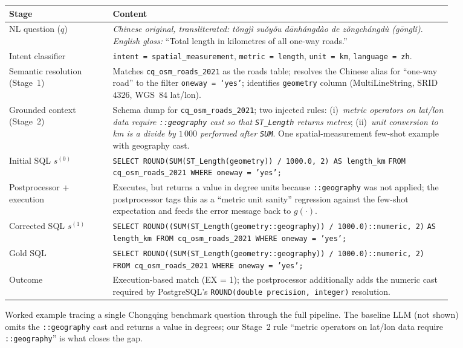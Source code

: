 \documentclass[11pt]{article}
\begin{document}
\begin{figure}[t]
\centering
\footnotesize
\begin{tabular}{@{}p{0.22\linewidth}p{0.72\linewidth}@{}}
\toprule
Stage & Content \\
\midrule
NL question ($q$) & \emph{Chinese original, transliterated:} \textit{t\v{o}ngj\`{i} su\v{o}y\v{o}u d\={a}nh\'{a}ngd\`{a}o de z\v{o}ngch\'{a}ngd\`{u} (g\={o}ngl\v{i})}. \emph{English gloss:} ``Total length in kilometres of all one-way roads.'' \\
\midrule
Intent classifier & \texttt{intent = spatial\_measurement}, \texttt{metric = length}, \texttt{unit = km}, \texttt{language = zh}. \\
\midrule
Semantic resolution (Stage~1) &
Matches \texttt{cq\_osm\_roads\_2021} as the roads table; resolves the Chinese alias for ``one-way road'' to the filter \texttt{oneway = `yes'}; identifies \texttt{geometry} column (MultiLineString, SRID $4326$, WGS~84 lat/lon). \\
\midrule
Grounded context (Stage~2) &
Schema dump for \texttt{cq\_osm\_roads\_2021}; two injected rules: (i)~\emph{metric operators on lat/lon data require \texttt{::geography} cast so that \texttt{ST\_Length} returns metres}; (ii)~\emph{unit conversion to km is a divide by $1\,000$ performed after \texttt{SUM}}. One spatial-measurement few-shot example with geography cast. \\
\midrule
Initial SQL $s^{(0)}$ &
\texttt{SELECT ROUND(SUM(ST\_Length(geometry)) / 1000.0, 2) AS length\_km}\newline
\texttt{FROM cq\_osm\_roads\_2021 WHERE oneway = 'yes';} \\
\midrule
Postprocessor + execution &
Executes, but returns a value in degree units because \texttt{::geography} was not applied; the postprocessor tags this as a ``metric unit sanity'' regression against the few-shot expectation and feeds the error message back to $g(\cdot)$. \\
\midrule
Corrected SQL $s^{(1)}$ &
\texttt{SELECT ROUND((SUM(ST\_Length(geometry::geography)) / 1000.0)::numeric, 2)}\newline
\texttt{AS length\_km FROM cq\_osm\_roads\_2021 WHERE oneway = 'yes';} \\
\midrule
Gold SQL &
\texttt{SELECT ROUND((SUM(ST\_Length(geometry::geography)) / 1000.0)::numeric, 2)}\newline
\texttt{FROM cq\_osm\_roads\_2021 WHERE oneway = 'yes';} \\
\midrule
Outcome & Execution-based match (EX = 1); the postprocessor additionally adds the numeric cast required by PostgreSQL's \texttt{ROUND(double precision, integer)} resolution. \\
\bottomrule
\end{tabular}
\caption{Worked example tracing a single Chongqing benchmark question through the full pipeline. The baseline LLM (not shown) omits the \texttt{::geography} cast and returns a value in degrees; our Stage~2 rule ``metric operators on lat/lon data require \texttt{::geography}'' is what closes the gap.}
\label{fig:worked-example}
\end{figure}
\end{document}
